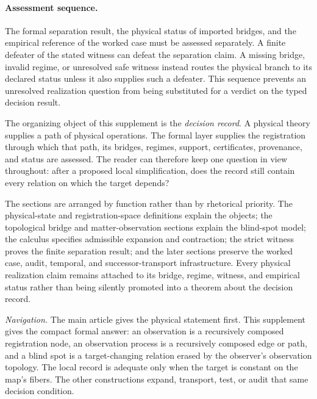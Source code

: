 \documentclass[11pt]{article}
\theoremstyle{definition}
\begin{document}
\paragraph{Assessment sequence.}
The formal separation result, the physical status of imported bridges, and the
empirical reference of the worked case must be assessed separately. A finite
defeater of the stated witness can defeat the separation claim. A missing bridge,
invalid regime, or unresolved safe witness instead routes the physical branch to
its declared status unless it also supplies such a defeater. This sequence prevents
an unresolved realization question from being substituted for a verdict on the
typed decision result.


The organizing object of this supplement is the \emph{decision record}. A
physical theory supplies a path of physical operations. The formal layer supplies
the registration through which that path, its bridges, regimes, support,
certificates, provenance, and status are assessed. The reader can therefore keep
one question in view throughout: after a proposed local simplification, does the
record still contain every relation on which the target depends?

The sections are arranged by function rather than by rhetorical priority. The
physical-state and registration-space definitions explain the objects; the
topological bridge and matter-observation sections explain the blind-spot model;
the calculus specifies admissible expansion and contraction; the strict witness
proves the finite separation result; and the later sections preserve the worked
case, audit, temporal, and successor-transport infrastructure. Every physical
realization claim remains attached to its bridge, regime, witness, and empirical
status rather than being silently promoted into a theorem about the decision
record.

\tableofcontents

\noindent\textit{Navigation.} The main article gives the physical statement first.
This supplement gives the compact formal answer: an observation is a recursively
composed registration node, an observation process is a recursively composed edge
or path, and a blind spot is a target-changing relation erased by the observer's
observation topology. The local record is adequate only when the target is constant
on the map's fibers. The other constructions expand, transport, test, or audit that
same decision condition.


\end{document}

